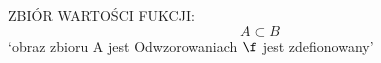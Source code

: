 \documentclass{article}
\begin{document}
ZBIÓR WARTOŚCI FUKCJI:
    \[A \subset B\]
    `obraz zbioru A jest Odwzorowaniach $\f$ jest zdefionowany'
\end{document}
